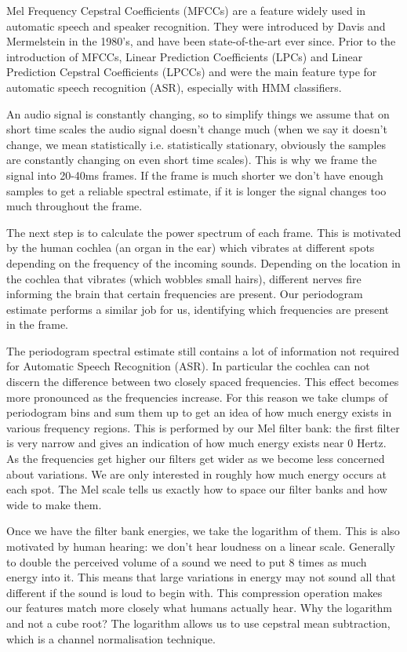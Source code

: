 Mel Frequency Cepstral Coefficients (MFCCs) are a feature widely used in automatic speech and speaker recognition. They were introduced by Davis and Mermelstein in the 1980's, and have been state-of-the-art ever since. Prior to the introduction of MFCCs, Linear Prediction Coefficients (LPCs) and Linear Prediction Cepstral Coefficients (LPCCs) and were the main feature type for automatic speech recognition (ASR), especially with HMM classifiers. 

An audio signal is constantly changing, so to simplify things we assume that on short time scales the audio signal doesn't change much (when we say it doesn't change, we mean statistically i.e. statistically stationary, obviously the samples are constantly changing on even short time scales). This is why we frame the signal into 20-40ms frames. If the frame is much shorter we don't have enough samples to get a reliable spectral estimate, if it is longer the signal changes too much throughout the frame.

The next step is to calculate the power spectrum of each frame. This is motivated by the human cochlea (an organ in the ear) which vibrates at different spots depending on the frequency of the incoming sounds. Depending on the location in the cochlea that vibrates (which wobbles small hairs), different nerves fire informing the brain that certain frequencies are present. Our periodogram estimate performs a similar job for us, identifying which frequencies are present in the frame.

The periodogram spectral estimate still contains a lot of information not required for Automatic Speech Recognition (ASR). In particular the cochlea can not discern the difference between two closely spaced frequencies. This effect becomes more pronounced as the frequencies increase. For this reason we take clumps of periodogram bins and sum them up to get an idea of how much energy exists in various frequency regions. This is performed by our Mel filter bank: the first filter is very narrow and gives an indication of how much energy exists near 0 Hertz. As the frequencies get higher our filters get wider as we become less concerned about variations. We are only interested in roughly how much energy occurs at each spot. The Mel scale tells us exactly how to space our filter banks and how wide to make them. 

Once we have the filter bank energies, we take the logarithm of them. This is also motivated by human hearing: we don't hear loudness on a linear scale. Generally to double the perceived volume of a sound we need to put 8 times as much energy into it. This means that large variations in energy may not sound all that different if the sound is loud to begin with. This compression operation makes our features match more closely what humans actually hear. Why the logarithm and not a cube root? The logarithm allows us to use cepstral mean subtraction, which is a channel normalisation technique.

